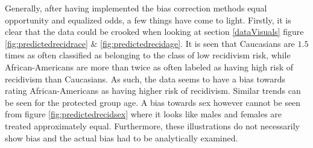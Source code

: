 \documentclass[11pt, fleqn, titlepage]{article}
\begin{document}
	
	
	
	Generally, after having implemented the bias correction methods equal opportunity and equalized odds, a few things have come to light. Firstly, it is clear that the data could be crooked when looking at section \ref{dataVisuals} figure \ref{fig:predictedrecidrace} \& \ref{fig:predictedrecidage}. It is seen that Caucasians are $ 1.5 $ times as often classified as belonging to the class of low recidivism risk, while African-Americans are more than twice as often labeled as having high risk of recidivism than Caucasians. As such, the data seems to have a bias towards rating African-Americans as having higher risk of recidivism. Similar trends can be seen for the protected group age. A bias towards sex however cannot be seen from figure \ref{fig:predictedrecidsex} where it looks like males and females are treated approximately equal. Furthermore, these illustrations do not necessarily show bias and the actual bias had to be analytically examined.
	\\\\
\end{document}
